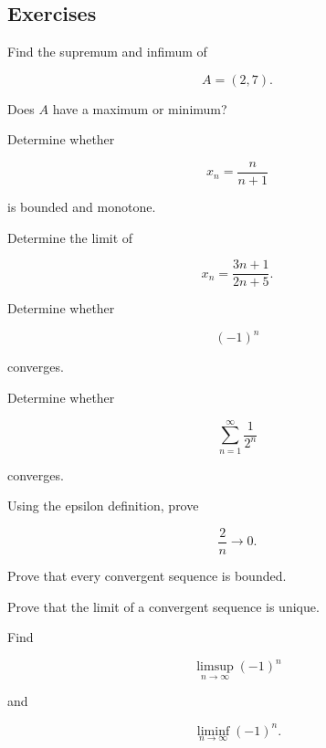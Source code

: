 \subsection{Exercises}
\label{subsec:real-analysis-exercises}

\begin{exercise}[1]
Find the supremum and infimum of

\[
A=(2,7).
\]

Does \(A\) have a maximum or minimum?
\end{exercise}

\begin{exercise}[1]
Determine whether

\[
x_n=\frac{n}{n+1}
\]

is bounded and monotone.
\end{exercise}

\begin{exercise}[1]
Determine the limit of

\[
x_n=\frac{3n+1}{2n+5}.
\]
\end{exercise}

\begin{exercise}[1]
Determine whether

\[
(-1)^n
\]

converges.
\end{exercise}

\begin{exercise}[1]
Determine whether

\[
\sum_{n=1}^{\infty}\frac1{2^n}
\]

converges.
\end{exercise}

\begin{exercise}[2]
Using the epsilon definition, prove

\[
\frac{2}{n}\to0.
\]
\end{exercise}

\begin{exercise}[2]
Prove that every convergent sequence is bounded.
\end{exercise}

\begin{exercise}[2]
Prove that the limit of a convergent sequence is unique.
\end{exercise}

\begin{exercise}[2]
Find

\[
\limsup_{n\to\infty}(-1)^n
\]

and

\[
\liminf_{n\to\infty}(-1)^n.
\]
\end{exercise}

